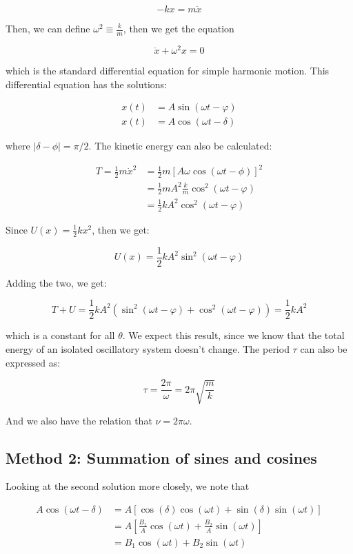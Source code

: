 \[ -kx = m\ddot x\]

Then, we can define $\omega^2 \equiv \frac{k}{m}$, then we get the equation 

\[ \ddot x + \omega^2 x = 0\]

which is the standard differential equation for simple harmonic motion. This differential equation has the solutions: 

\begin{align*}
    x(t) &= A \sin (\omega t - \varphi)\\
    x(t) &= A \cos(\omega t - \delta)
\end{align*}

where $|\delta - \phi| = \pi/2$. The kinetic energy can also be calculated: 

\begin{align*}
    T = \frac 12 m\dot x^2 &= \frac 12 m \left[ A\omega \cos(\omega t - \phi)\right]^2\\
    &= \frac 12 mA^2 \frac{k}{m} \cos^2 (\omega t - \varphi)\\
    &= \frac 12 kA^2 \cos^2 (\omega t - \varphi)
\end{align*}

Since $U(x) = \frac 12 kx^2$, then we get: 

\[ U(x) = \frac 12 kA^2 \sin^2(\omega t - \varphi)\]

Adding the two, we get: 

\[ T + U = \frac 12 kA^2 (\sin^2 (\omega t - \varphi) + \cos^2 (\omega t - \varphi)) = \frac 12 kA^2\]

which is a constant for all $\theta$. We expect this result, since we know that the total energy of an isolated oscillatory system doesn't change. The period $\tau$ can also be expressed as: 

\[ \tau = \frac{2\pi}{\omega} = 2\pi \sqrt{\frac mk}\] 

And we also have the relation that $\nu = 2\pi \omega$. 

\subsection{Method 2: Summation of sines and cosines}

Looking at the second solution more closely, we note that 

\begin{align*}
    A \cos (\omega t - \delta) &= A \left[ \cos(\delta) \cos (\omega t) + \sin (\delta) \sin(\omega t)\right]\\
    &= A \left[ \frac{B_1}{A} \cos (\omega t) + \frac{B_2}{A}\sin (\omega t)\right]\\
    &= B_1 \cos (\omega t) + B_2 \sin (\omega t)
\end{align*}

